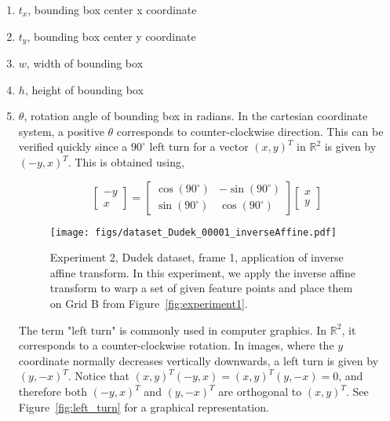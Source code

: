 \begin{enumerate}
\item $t_x$, bounding box center x coordinate
\item $t_y$, bounding box center y coordinate
\item $w$, width of bounding box
\item $h$, height of bounding box
\item $\theta$, rotation angle of bounding box in radians.  In the cartesian coordinate system, a positive $\theta$ corresponds to counter-clockwise direction.  This can be verified quickly since a $90^{\circ}$ left turn for a vector $(x,y)^T$ in $\mathbb{R}^2$ is given by $(-y,x)^T$.  This is obtained using,


\begin{equation}
\left[\begin{array}{ccc}
-y 
\\ 
x
\end{array}
\right]=
\left[
\begin{array}{rrr}
\cos(90^{\circ}) & -\sin(90^{\circ}) \\
\sin(90^{\circ}) & \cos(90^{\circ})
\end{array}
\right]
\left[\begin{array}{ccc}
x 
\\ 
y
\end{array}
\right]
\end{equation}

								\begin{figure}[t]
								\centering
								\texttt{[image: figs/dataset\_Dudek\_00001\_inverseAffine.pdf]}
								\caption{Experiment 2, Dudek dataset, frame 1, application of inverse affine transform.  In this experiment, we apply the inverse affine transform to warp a set of given feature points and place them on Grid B from Figure~\ref{fig:experiment1}.}
								\label{fig:experiment2}
								\end{figure}


The term "left turn" is commonly used in computer graphics.  In  $\mathbb{R}^2$, it corresponds to a counter-clockwise rotation.  In images, where the $y$ coordinate normally decreases vertically downwards, a left turn is given by $(y,-x)^T$.  Notice that $(x,y)^T(-y,x) = (x,y)^T(y,-x) = 0$, and therefore both $ (-y,x)^T$ and $(y,-x)^T$ are orthogonal to $(x,y)^T$.  See Figure~\ref{fig:left_turn} for a graphical representation.
\end{enumerate}

